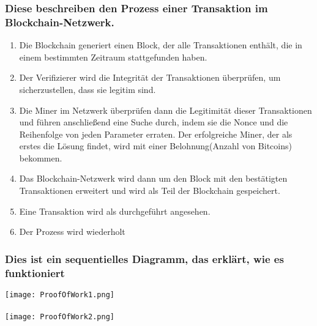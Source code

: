 \subsubsection{Diese beschreiben den Prozess einer Transaktion im Blockchain-Netzwerk.}
\begin{enumerate}
	\item Die Blockchain generiert einen Block, der alle Transaktionen enthält, die in einem bestimmten Zeitraum stattgefunden haben.
	\item Der Verifizierer wird die Integrität der Transaktionen überprüfen, um sicherzustellen, dass sie legitim sind.
	\item Die Miner im Netzwerk überprüfen dann die Legitimität dieser Transaktionen und führen anschließend eine Suche durch, indem sie die Nonce und die Reihenfolge von jeden Parameter erraten. Der erfolgreiche Miner, der als erstes die Lösung findet, wird mit einer Belohnung(Anzahl von Bitcoins) bekommen.
	\item Das Blockchain-Netzwerk wird dann um den Block mit den bestätigten Transaktionen erweitert und wird als Teil der Blockchain gespeichert.
	\item Eine Transaktion wird als durchgeführt angesehen.
	\item Der Prozess wird wiederholt \\
\end{enumerate}
\subsubsection{Dies ist ein sequentielles Diagramm, das erklärt, wie es funktioniert}
\texttt{[image: ProofOfWork1.png]} \\ \\
\texttt{[image: ProofOfWork2.png]}

